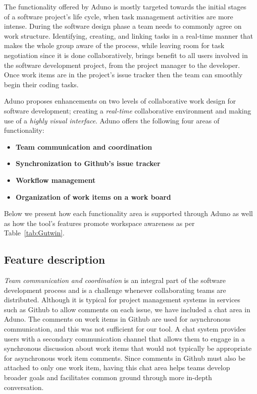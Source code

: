 \documentclass[conference]{IEEEtran}
\begin{document}
The functionality offered by Aduno is mostly targeted towards the initial stages of a software project's life cycle, when task management activities are more intense. During the software design phase a team needs to commonly agree on work structure. Identifying, creating, and linking tasks in a real-time manner that makes the whole group aware of the process, while leaving room for task negotiation since it is done collaboratively, brings benefit to all users involved in the software development project, from the project manager to the developer. Once work items are in the project's issue tracker then the team can smoothly begin their coding tasks.

Aduno proposes enhancements on two levels of collaborative work design for software development; creating a \textit{real-time} collaborative environment and making use of a \textit{highly visual interface}. Aduno offers the following four areas of functionality:

\begin{itemize}
	\item \textbf{Team communication and coordination}
	\item \textbf{Synchronization to Github's issue tracker}
	\item \textbf{Workflow management}
	\item \textbf{Organization of work items on a work board}
\end{itemize}

Below we present how each functionality area is supported through Aduno as well as how the tool's features promote workspace awareness as per Table~\ref{tab:Gutwin}. 
\subsection{Feature description}

\textit{Team communication and coordination} is an integral part of the software development process and is a challenge whenever collaborating teams are distributed. Although it is typical for project management systems in services such as Github to allow comments on each issue, we have included a chat area in Aduno. The comments on work items in Github are used for asynchronous communication, and this was not sufficient for our tool. A chat system provides users with a secondary communication channel that allows them to engage in a synchronous discussion about work items that would not typically be appropriate for asynchronous work item comments. Since comments in Github must also be attached to only one work item, having this chat area helps teams develop broader goals and facilitates common ground through more in-depth conversation.
\end{document}

